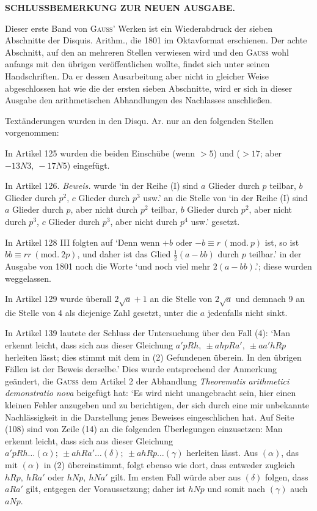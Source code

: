 \begin{center}\bfseries SCHLUSSBEMERKUNG ZUR NEUEN AUSGABE.\end{center}

Dieser erste Band von \textsc{Gauss}' Werken ist ein Wiederabdruck der sieben Abschnitte der Disquis. Arithm., die 1801 im Oktavformat erschienen. Der achte Abschnitt, auf den an mehreren Stellen verwiesen wird und den \textsc{Gauss} wohl anfangs mit den übrigen veröffentlichen wollte, findet sich unter seinen Handschriften. Da er dessen Ausarbeitung aber nicht in gleicher Weise abgeschlossen hat wie die der ersten sieben Abschnitte, wird er sich in dieser Ausgabe den arithmetischen Abhandlungen des Nachlasses anschließen.

Textänderungen wurden in den Disqu. Ar. nur an den folgenden Stellen vorgenommen:

In Artikel 125 wurden die beiden Einschübe (wenn \(>5\)) und (\(>17\); aber \(-13N3,\allowbreak\ -17N5\)) eingefügt.

In Artikel 126. \textit{Beweis.} wurde ‘in der Reihe (I) sind \(a\) Glieder durch \(p\) teilbar, \(b\) Glieder durch \(p^2\), \(c\) Glieder durch \(p^3\) usw.’ an die Stelle von ‘in der Reihe (I) sind \(a\) Glieder durch \(p\), aber nicht durch \(p^2\) teilbar, \(b\) Glieder durch \(p^2\), aber nicht durch \(p^3\), \(c\) Glieder durch \(p^3\), aber nicht durch \(p^4\) usw.’ gesetzt.

In Artikel 128 III folgten auf ‘Denn wenn \(+b\) oder \(-b\equiv r\ (\mathrm{mod.}\ p)\) ist, so ist \(bb\equiv rr\ (\mathrm{mod.}\ 2p)\), und daher ist das Glied \(\frac12(a-bb)\) durch \(p\) teilbar.’ in der Ausgabe von 1801 noch die Worte ‘und noch viel mehr \(2(a-bb)\).’; diese wurden weggelassen.

In Artikel 129 wurde überall \(2\surd a+1\) an die Stelle von \(2\surd a\) und demnach 9 an die Stelle von 4 als diejenige Zahl gesetzt, unter die \(a\) jedenfalls nicht sinkt.

In Artikel 139 lautete der Schluss der Untersuchung über den Fall (4): ‘Man erkennt leicht, dass sich aus dieser Gleichung \(a'pRh,\allowbreak\ \pm ahpRa',\allowbreak\ \pm aa'hRp\) herleiten lässt; dies stimmt mit dem in (2) Gefundenen überein. In den übrigen Fällen ist der Beweis derselbe.’ Dies wurde entsprechend der Anmerkung geändert, die \textsc{Gauss} dem Artikel 2 der Abhandlung \textit{Theorematis arithmetici demonstratio nova} beigefügt hat: ‘Es wird nicht unangebracht sein, hier einen kleinen Fehler anzugeben und zu berichtigen, der sich durch eine mir unbekannte Nachlässigkeit in die Darstellung jenes Beweises eingeschlichen hat. Auf Seite (108) sind von Zeile (14) an die folgenden Überlegungen einzusetzen: Man erkennt leicht, dass sich aus dieser Gleichung \(a'pRh\ldots(\alpha);\allowbreak\ \pm ahRa'\ldots(\delta);\allowbreak\ \pm ahRp\ldots(\gamma)\) herleiten lässt. Aus \((\alpha)\), das mit \((\alpha)\) in (2) übereinstimmt, folgt ebenso wie dort, dass entweder zugleich \(hRp,\allowbreak\ hRa'\) oder \(hNp,\allowbreak\ hNa'\) gilt. Im ersten Fall würde aber aus \((\delta)\) folgen, dass \(aRa'\) gilt, entgegen der Voraussetzung; daher ist \(hNp\) und somit nach \((\gamma)\) auch \(aNp\).

